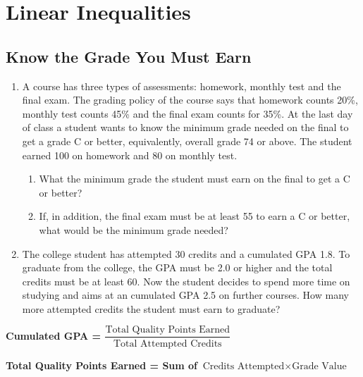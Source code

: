 \documentclass[
  en,11pt]{elegantbook}
\providecommand{\tightlist}{%
  \setlength{\itemsep}{0pt}\setlength{\parskip}{0pt}}
\newcommand{\size}[2]{{\fontsize{#1}{0}\selectfont#2}}
\newenvironment{rmdthink}{
	\vspace*{0.5\baselineskip}
	\par\noindent
	\makebox[-4pt][r]{\color{green!90}\size{12}{\faLightbulbO}\,\,}
    \begin{tcolorbox}[
    enhanced,
    title={\textbf{\color{second}Think}},
    title style={left color=blue!10!green!20!white,right color=yellow!20!blue!20!white},
    colback=green!20!white,
    ]
    \sffamily
}{
    \end{tcolorbox}
	\par\ignorespacesafterend
}
\begin{document}
\hypertarget{linear-inequalities}{%
\chapter{Linear Inequalities}\label{linear-inequalities}}

\hypertarget{know-the-grade-you-must-earn}{%
\section{Know the Grade You Must Earn}\label{know-the-grade-you-must-earn}}

\begin{rmdthink}

\begin{enumerate}
\def\labelenumi{\arabic{enumi}.}
\tightlist
\item
  A course has three types of assessments: homework, monthly test and the final exam. The grading policy of the course says that homework counts 20\%, monthly test counts 45\% and the final exam counts for 35\%. At the last day of class a student wants to know the minimum grade needed on the final to get a grade C or better, equivalently, overall grade 74 or above. The student earned 100 on homework and 80 on monthly test.

  \begin{enumerate}
  \def\labelenumii{\arabic{enumii}.}
  \tightlist
  \item
    What the minimum grade the student must earn on the final to get a C or better?
  \item
    If, in addition, the final exam must be at least 55 to earn a C or better, what would be the minimum grade needed?
  \end{enumerate}
\item
  The college student has attempted 30 credits and a cumulated GPA 1.8. To graduate from the college, the GPA must be 2.0 or higher and the total credits must be at least 60. Now the student decides to spend more time on studying and aims at an cumulated GPA 2.5 on further courses.
  How many more attempted credits the student must earn to graduate?
\end{enumerate}

\textbf{Cumulated GPA = \(\dfrac{\text{Total Quality Points Earned}}{\text{Total Attempted Credits}}\)}

\textbf{Total Quality Points Earned = Sum of \(\text{Credits Attempted}\times \text{Grade Value}\)}

\end{rmdthink}
\end{document}
